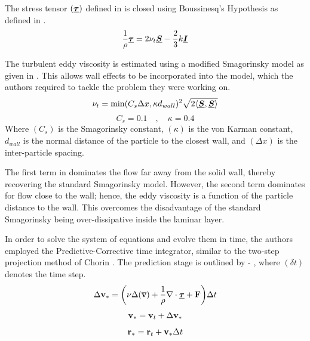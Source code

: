 The stress tensor $(\underline{\bm{\tau}})$ defined in  is closed using Boussinesq’s Hypothesis as defined in .
\begin{equation}
    \frac{1}{\rho} \underline{\bm{\tau}} = 2\nu_t \underline{\bm{S}} - \frac{2}{3}k\underline{\bm{I}}
    \label{eq:Gotoh2004-boussinesq}
\end{equation}

The turbulent eddy viscosity is estimated using a modified Smagorinsky model as given in . This allows wall effects to be incorporated into the model, which the authors required to tackle the problem they were working on.
\begin{equation}
    \nu_t = \min(C_s \Delta x, \kappa d_{wall})^2 \sqrt{2 \langle \underline{\bm{S}}, \underline{\bm{S}} \rangle}
    \label{eq:Gotoh2004-eddy-visc}
\end{equation}
\begin{equation}
    C_s=0.1 \quad , \quad \kappa=0.4
\end{equation}
Where $(C_s)$ is the Smagorinsky constant, $(\kappa)$ is the von Karman constant, $d_{wall}$ is the normal distance of the particle to the closest wall, and $(\Delta x)$ is the inter-particle spacing.

The first term in  dominates the flow far away from the solid wall, thereby recovering the standard Smagorinsky model. However, the second term dominates for flow close to the wall; hence, the eddy viscosity is a function of the particle distance to the wall. This overcomes the disadvantage of the standard Smagorinsky being over-dissipative inside the laminar layer.

In order to solve the system of equations and evolve them in time, the authors employed the Predictive-Corrective time integrator, similar to the two-step projection method of Chorin \parencite{chorin1968numerical}. The prediction stage is outlined by  - , where $(\delta t)$ denotes the time step.
\begin{equation}
    \Delta \mathbf{v}_* = \bigg( \nu \Delta ( \mathbf{\overline{v}} ) + \frac{1}{\rho}\nabla\cdot\underline{\bm{\tau}} + \mathbf{F} \bigg) \Delta t
    \label{eq:Gotoh2004-predict-start}
\end{equation}
\begin{equation}
    \mathbf{v}_* = \mathbf{v}_t + \Delta \mathbf{v}_*
\end{equation}
\begin{equation}
    \mathbf{r}_* = \mathbf{r}_t + \mathbf{v}_* \Delta t
    \label{eq:Gotoh2004-predict-end}
\end{equation}

